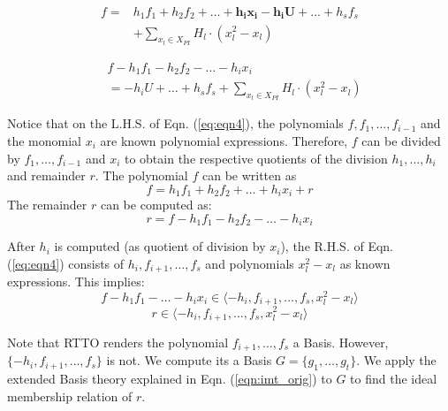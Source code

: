 \begin{equation}
\begin{split}
 f = & h_1f_1 + h_2f_2 + \dots+\boldsymbol{h_ix_i-h_iU}+\dots+h_sf_s \\
 & + \sum_{x_l \in X_{PI}} H_l \cdot(x_l^2-x_l)   
\end{split}
\label{eq:eqn3}
\end{equation}

\vspace{-0.15in}

\begin{equation}
\label{eq:eqn4}
\begin{split}
   & f - h_1f_1 - h_2f_2 - \dots-h_ix_i \\
   & = -h_iU+\dots+h_sf_s + \sum_{x_l \in X_{PI}} H_l \cdot(x_l^2-x_l) 
\end{split}
\end{equation}


Notice that on the L.H.S. of Eqn. (\ref{eq:eqn4}), the polynomials
$f, f_1,\dots,f_{i-1}$ and the monomial $x_i$ are known polynomial expressions. Therefore, $f$ can be divided by $f_1,\dots,f_{i-1}$ and $x_i$ to obtain the respective quotients of the division
$h_1,\dots,h_i$ and remainder $r$. The polynomial $f$ can be written as 
\begin{equation}
f = h_1f_1 + h_2f_2 + \dots + h_ix_i + r
\end{equation}
The remainder $r$ can be computed as:
\begin{equation}
r = f - h_1f_1 - h_2f_2 - \dots - h_ix_i
\label{eq:eqnr}
\end{equation}

After $h_i$ is computed (as quotient of division by $x_i$),
the R.H.S. of Eqn. (\ref{eq:eqn4}) consists of $h_i,f_{i+1},\dots,f_s$ and polynomials $x_l^2-x_l$ as known expressions. This
implies:
\vspace{-1mm}
\begin{equation}
f - h_1f_1 - \dots-h_ix_i \in \langle -h_i,f_{i+1},\dots,f_s,  x_l^2-x_l\rangle
\end{equation}
\vspace{-4mm}
\begin{equation}
r \in \langle -h_i,f_{i+1},\dots,f_s,  x_l^2-x_l\rangle
\label{eq:eqn5}
\end{equation}

Note that RTTO renders the polynomial $f_{i+1},\dots,f_s$ a \Grobner
Basis. However, $\{-h_i,f_{i+1},\dots,f_s\}$ is not. We compute its a
\Grobner Basis $G = \{g_1,\dots, g_t\}$. We apply the extended
\Grobner Basis theory explained in Eqn. (\ref{eqn:imt_orig}) to $G$ to
find the ideal membership relation of $r$. 

